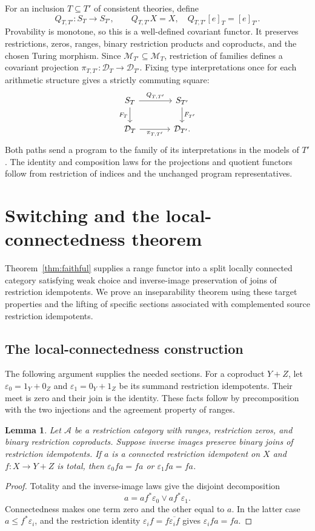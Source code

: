 \documentclass[11pt]{article}
\newtheorem{lemma}[theorem]{Lemma}
\begin{document}
For an inclusion $T\subseteq T'$ of consistent theories, define
\[
 Q_{T,T'}:S_T\to S_{T'},\qquad
 Q_{T,T'}X=X,\quad Q_{T,T'}[e]_T=[e]_{T'}.
\]
Provability is monotone, so this is a well-defined covariant functor.
It preserves restrictions, zeros, ranges, binary restriction products
and coproducts, and the chosen Turing morphism.
Since $\mathcal M_{T'}\subseteq\mathcal M_T$, restriction of families
defines a covariant projection
$\pi_{T,T'}:\mathcal D_T\to\mathcal D_{T'}$. Fixing type interpretations
once for each arithmetic structure gives a strictly commuting square:
\[
\begin{tikzcd}[column sep=large]
 S_T \arrow[r,"Q_{T,T'}"] \arrow[d,"F_T"'] &
 S_{T'} \arrow[d,"F_{T'}"]\\
 \mathcal D_T \arrow[r,"\pi_{T,T'}"'] & \mathcal D_{T'}.
\end{tikzcd}
\]
Both paths send a program to the family of its interpretations in the
models of $T'$. The identity and composition laws for the projections
and quotient functors follow from restriction of indices and the
unchanged program representatives.

\section{Switching and the local-connectedness theorem}\label{sec:lifting}

Theorem~\ref{thm:faithful} supplies a range functor into a split locally
connected category satisfying weak choice and inverse-image preservation
of joins of restriction idempotents. We prove an inseparability theorem
using these target properties and the lifting of specific sections associated with
complemented source restriction idempotents.

\subsection{The local-connectedness construction}

The following argument supplies the needed sections.
For a coproduct $Y+Z$, let
$\varepsilon_0=1_Y+0_Z$ and $\varepsilon_1=0_Y+1_Z$ be its summand
restriction idempotents. Their meet is zero and their join is the identity. These facts
follow by precomposition with the two injections and the agreement
property of ranges.

\begin{lemma}\label{lem:connected-alternative}
Let $\mathcal A$ be a restriction category with ranges, restriction zeros,
and binary restriction coproducts. Suppose inverse images preserve binary
joins of restriction idempotents. If $a$ is a connected restriction
idempotent on $X$ and
$f:X\to Y+Z$ is total, then
$\varepsilon_0fa=fa$ or $\varepsilon_1fa=fa$.
\end{lemma}
\begin{proof}
Totality and the inverse-image laws give the disjoint decomposition
\[
 a=af^*\varepsilon_0\vee af^*\varepsilon_1.
\]
Connectedness makes one term zero and the other equal to $a$. In the
latter case $a\le f^*\varepsilon_i$, and the restriction identity
$\varepsilon_i f=f\overline{\varepsilon_i f}$ gives
$\varepsilon_i fa=fa$.
\end{proof}
\end{document}
